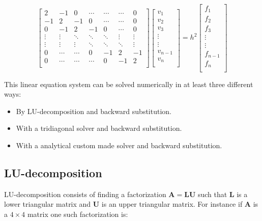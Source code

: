 \documentclass{article}
\begin{document}
\begin{equation*}
\begin{bmatrix}
2      & -1     & 0       & \cdots  & \cdots  & \cdots  & 0      \\
-1     & 2      & -1      & 0       & \cdots  & \cdots  & 0      \\
0      & -1     & 2       & -1      & 0       & \cdots  & 0      \\
\vdots & \vdots & \ddots  & \ddots  & \ddots  & \vdots  & \vdots \\
\vdots & \vdots & \vdots  & \ddots  & \ddots  & \ddots  & \vdots \\
0      & \cdots & \cdots  & 0       & -1      & 2       & -1     \\
0      & \cdots & \cdots  & \cdots  & 0       & -1      & 2      \\
\end{bmatrix}
\begin{bmatrix}
v_1 \\
v_2 \\
v_3 \\
\vdots \\
\vdots \\
v_{n-1} \\
v_n \\
\end{bmatrix}
= h^2
\begin{bmatrix}
f_1 \\
f_2 \\
f_3 \\
\vdots \\
\vdots \\
f_{n-1} \\
f_n \\
\end{bmatrix}
\end{equation*}

This linear equation system can be solved numerically in at least three different ways:

\begin{itemize}
\item By LU-decomposition and backward substitution.
\item With a tridiagonal solver and backward substitution.
\item With a analytical custom made solver and backward substitution.
\end{itemize}

\subsection{LU-decomposition}
LU-decomposition consists of finding a factorization $\bm{A}=\bm{L}\bm{U}$ such that $\bm{L}$ is a lower triangular matrix and $\bm{U}$ is an upper triangular matrix. For instance if $\bm{A}$ is a $4 \times 4$ matrix one such factorization is:
\end{document}

